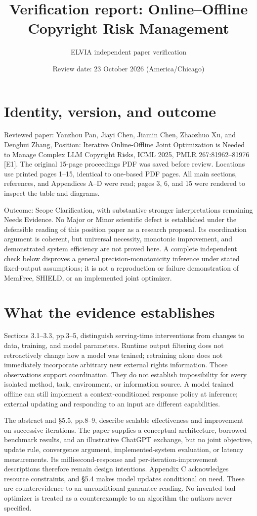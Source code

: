 \documentclass[10pt]{article}
\title{Verification report: Online–Offline Copyright Risk Management}
\author{ELVIA independent paper verification}
\date{Review date: 23 October 2026 (America/Chicago)}
\begin{document}
\maketitle
\section*{Identity, version, and outcome}
Reviewed paper: Yanzhou Pan, Jiayi Chen, Jiamin Chen, Zhaozhuo Xu, and Denghui Zhang, Position: Iterative Online-Offline Joint Optimization is Needed to Manage Complex LLM Copyright Risks, ICML 2025, PMLR 267:81962–81976 [E1]. The original 15-page proceedings PDF was saved before review. Locations use printed pages 1–15, identical to one-based PDF pages. All main sections, references, and Appendices A–D were read; pages 3, 6, and 15 were rendered to inspect the table and diagrams.\par
Outcome: Scope Clarification, with substantive stronger interpretations remaining Needs Evidence. No Major or Minor scientific defect is established under the defensible reading of this position paper as a research proposal. Its coordination argument is coherent, but universal necessity, monotonic improvement, and demonstrated system efficiency are not proved here. A complete independent check below disproves a general precision-monotonicity inference under stated fixed-output assumptions; it is not a reproduction or failure demonstration of MemFree, SHIELD, or an implemented joint optimizer.\par
\section*{What the evidence establishes}
Sections 3.1–3.3, pp.3–5, distinguish serving-time interventions from changes to data, training, and model parameters. Runtime output filtering does not retroactively change how a model was trained; retraining alone does not immediately incorporate arbitrary new external rights information. Those observations support coordination. They do not establish impossibility for every isolated method, task, environment, or information source. A model trained offline can still implement a context-conditioned response policy at inference; external updating and responding to an input are different capabilities.\par
The abstract and §5.5, pp.8–9, describe scalable effectiveness and improvement on successive iterations. The paper supplies a conceptual architecture, borrowed benchmark results, and an illustrative ChatGPT exchange, but no joint objective, update rule, convergence argument, implemented-system evaluation, or latency measurements. Its millisecond-response and per-iteration-improvement descriptions therefore remain design intentions. Appendix C acknowledges resource constraints, and §5.4 makes model updates conditional on need. These are counterevidence to an unconditional guarantee reading. No invented bad optimizer is treated as a counterexample to an algorithm the authors never specified.\par
\end{document}
